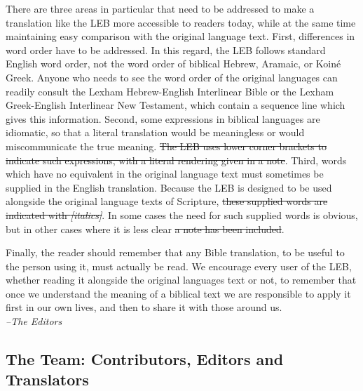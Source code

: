 There are three areas in particular that need to be addressed to make a translation like the LEB more accessible to readers 
today, while at the same time maintaining easy comparison with the original language text. First, differences in word order 
have to be addressed. In this regard, the LEB follows standard English word order, not the word order of biblical Hebrew, 
Aramaic, or Koiné Greek. Anyone who needs to see the word order of the original languages can readily consult the Lexham 
Hebrew-English Interlinear Bible or the Lexham Greek-English Interlinear New Testament, which contain a sequence line which 
gives this information. Second, some expressions in biblical languages are idiomatic, so that a literal translation would 
be meaningless or would miscommunicate the true meaning. \st{The LEB uses lower corner brackets to indicate such expressions, 
with a literal rendering given in a note}. Third, words which have no equivalent in the original language text must sometimes 
be supplied in the English translation. Because the LEB is designed to be used alongside the original language texts of 
Scripture, \st{these supplied words are indicated with \textit{[italics]}}. In some cases the need for such supplied words is obvious, 
but in other cases where it is less clear \st{a note has been included}.\par
Finally, the reader should remember that any Bible translation, to be useful to the person using it, must actually be read. 
We encourage every user of the LEB, whether reading it alongside the original languages text or not, to remember that once 
we understand the meaning of a biblical text we are responsible to apply it first in our own lives, and then to share it 
with those around us.\\
\textit{--The Editors}\par




\clearpage

\subsection*{The Team: Contributors, Editors and Translators}

